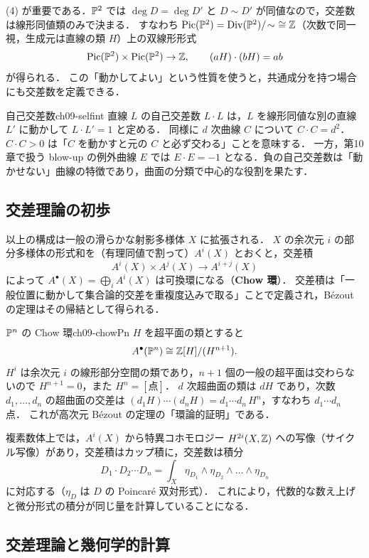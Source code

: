 (4) が重要である．$\mathbb{P}^2$ では $\deg D=\deg D'$ と $D\sim D'$ が同値なので，交差数は線形同値類のみで決まる．
すなわち $\Pic(\PP^2)=\Div(\PP^2)/\!\sim\ \cong\Z$（次数で同一視，生成元は直線の類 $H$）上の双線形形式
\[
  \operatorname{Pic}(\mathbb{P}^2)\times\operatorname{Pic}(\mathbb{P}^2)\to\mathbb{Z},\qquad (aH)\cdot(bH)=ab
\]
が得られる．
この「動かしてよい」という性質を使うと，共通成分を持つ場合にも交差数を定義できる．

\begin{myex}{自己交差数}{ch09-selfint}
直線 $L$ の自己交差数 $L\cdot L$ は，$L$ を線形同値な別の直線 $L'$ に動かして $L\cdot L'=1$ と定める．
同様に $d$ 次曲線 $C$ について $C\cdot C=d^2$．
$C\cdot C>0$ は「$C$ を動かすと元の $C$ と必ず交わる」ことを意味する．
一方，第10章で扱う blow-up の例外曲線 $E$ では $E\cdot E=-1$ となる．負の自己交差数は「動かせない」曲線の特徴であり，曲面の分類で中心的な役割を果たす．
\end{myex}

\subsection{交差理論の初歩}

以上の構成は一般の滑らかな射影多様体 $X$ に拡張される．
$X$ の余次元 $i$ の部分多様体の形式和を（有理同値で割って）$A^i(X)$ とおくと，交差積
\[
  A^i(X)\times A^j(X)\to A^{i+j}(X)
\]
によって $A^\bullet(X)=\bigoplus_iA^i(X)$ は可換環になる（\textbf{Chow 環}）．
交差積は「一般位置に動かして集合論的交差を重複度込みで取る」ことで定義され，B\'ezout の定理はその帰結として得られる．

\begin{myex}{$\mathbb{P}^n$ の Chow 環}{ch09-chowPn}
$H$ を超平面の類とすると
\[
  A^\bullet(\mathbb{P}^n)\cong\mathbb{Z}[H]/(H^{n+1}).
\]
$H^i$ は余次元 $i$ の線形部分空間の類であり，$n+1$ 個の一般の超平面は交わらないので $H^{n+1}=0$，また $H^n=[\text{点}]$．
$d$ 次超曲面の類は $dH$ であり，次数 $d_1,\dots,d_n$ の超曲面の交差は $(d_1H)\cdots(d_nH)=d_1\cdots d_n\,H^n$，すなわち $d_1\cdots d_n$ 点．
これが高次元 B\'ezout の定理の「環論的証明」である．
\end{myex}

複素数体上では，$A^i(X)$ から特異コホモロジー $H^{2i}(X,\mathbb{Z})$ への写像（サイクル写像）があり，交差積はカップ積に，交差数は積分
\[
  D_1\cdot D_2\cdots D_n=\int_X\eta_{D_1}\wedge\eta_{D_2}\wedge\dots\wedge\eta_{D_n}
\]
に対応する（$\eta_D$ は $D$ の Poincar\'e 双対形式）．
これにより，代数的な数え上げと微分形式の積分が同じ量を計算していることになる．

\subsection{交差理論と幾何学的計算}

